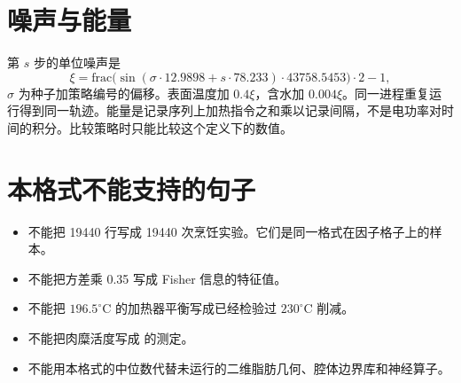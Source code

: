 \section{噪声与能量}

第 \(s\) 步的单位噪声是
\begin{equation}
\xi=\mathrm{frac}\big(\sin(\sigma\cdot 12.9898+s\cdot 78.233)\cdot 43758.5453\big)\cdot 2-1,
\end{equation}
\(\sigma\) 为种子加策略编号的偏移。表面温度加 \(0.4\xi\)，含水加 \(0.004\xi\)。同一进程重复运行得到同一轨迹。能量是记录序列上加热指令之和乘以记录间隔，不是电功率对时间的积分。比较策略时只能比较这个定义下的数值。

\section{本格式不能支持的句子}

\begin{itemize}
\item 不能把 19440 行写成 19440 次烹饪实验。它们是同一格式在因子格子上的样本。
\item 不能把方差乘 0.35 写成 Fisher 信息的特征值。
\item 不能把 \(196.5^\circ\mathrm{C}\) 的加热器平衡写成已经检验过 \(230^\circ\mathrm{C}\) 削减。
\item 不能把肉糜活度写成 \cite{sorption2026} 的测定。
\item 不能用本格式的中位数代替未运行的二维脂肪几何、腔体边界库和神经算子。
\end{itemize}
